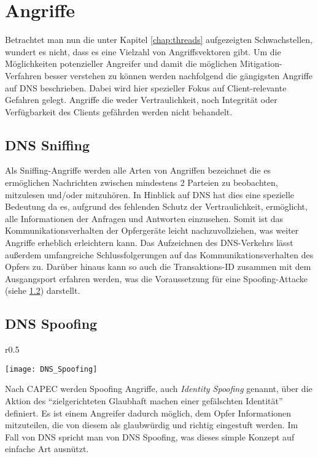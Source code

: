 \chapter{Angriffe}
\label{chap:attacks}
Betrachtet man nun die unter Kapitel \ref{chap:threads} aufgezeigten Schwachstellen, wundert es nicht, dass es eine Vielzahl von Angriffsvektoren gibt. Um die Möglichkeiten potenzieller Angreifer und damit die möglichen Mitigation-Verfahren besser verstehen zu können werden nachfolgend die gängigsten Angriffe auf DNS beschrieben. Dabei wird hier spezieller Fokus auf Client-relevante Gefahren gelegt. Angriffe die weder Vertraulichkeit, noch Integrität oder Verfügbarkeit des Clients gefährden werden nicht behandelt.

\section{DNS Sniffing}
\label{sec:attacks-dnssniffing}
Als Sniffing-Angriffe werden alle Arten von Angriffen bezeichnet die es ermöglichen Nachrichten zwischen mindestens 2 Parteien zu beobachten, mitzulesen und/oder mitzuhören\cite{CAPEC157}. In Hinblick auf DNS hat dies eine spezielle Bedeutung da es, aufgrund des fehlenden Schutz der Vertraulichkeit, ermöglicht, alle Informationen der Anfragen und Antworten einzusehen. Somit ist das Kommunikationsverhalten der Opfergeräte leicht nachzuvollziehen, was weiter Angriffe erheblich erleichtern kann. Das Aufzeichnen des DNS-Verkehrs lässt außerdem umfangreiche Schlussfolgerungen auf das Kommunikationsverhalten des Opfers zu. Darüber hinaus kann so auch die Transaktions-ID zusammen mit dem Ausgangsport erfahren werden, was die Voraussetzung für eine Spoofing-Attacke (siehe \ref{sec:attacks-dnsspoofing}) darstellt. 

\section{DNS Spoofing}
\label{sec:attacks-dnsspoofing}
\begin{wrapfigure}{r}{0.5\textwidth}
    \begin{center}
        \texttt{[image: DNS\_Spoofing]}
    \end{center}
    \caption{}
    \label{img:dnsspoofing}
\end{wrapfigure}

Nach CAPEC werden Spoofing Angriffe, auch \textit{Identity Spoofing} genannt, über die Aktion des ``zielgerichteten Glaubhaft machen einer gefälschten Identität'' definiert. Es ist einem Angreifer dadurch möglich, dem Opfer Informationen mitzuteilen, die von diesem als glaubwürdig und richtig eingestuft werden. Im Fall von DNS spricht man von DNS Spoofing, was dieses simple Konzept auf einfache Art ausnützt.

